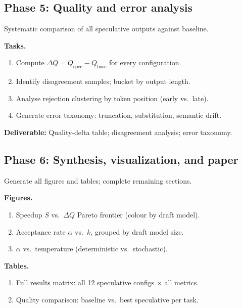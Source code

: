 \subsection{Phase 5: Quality and error analysis}

Systematic comparison of all speculative outputs against baseline.

\smallskip\noindent\textbf{Tasks.}
\begin{enumerate}\itemsep0pt
    \item Compute $\Delta Q = Q_{\text{spec}} - Q_{\text{base}}$ for every configuration.
    \item Identify disagreement samples; bucket by output length.
    \item Analyse rejection clustering by token position (early vs.\ late).
    \item Generate error taxonomy: truncation, substitution, semantic drift.
\end{enumerate}

\noindent\textbf{Deliverable:} Quality-delta table; disagreement analysis; error taxonomy.

\subsection{Phase 6: Synthesis, visualization, and paper}

Generate all figures and tables; complete remaining sections.

\smallskip\noindent\textbf{Figures.}
\begin{enumerate}\itemsep0pt
    \item Speedup $S$ vs.\ $\Delta Q$ Pareto frontier (colour by draft model).
    \item Acceptance rate $\alpha$ vs.\ $k$, grouped by draft model size.
    \item $\alpha$ vs.\ temperature (deterministic vs.\ stochastic).
\end{enumerate}

\smallskip\noindent\textbf{Tables.}
\begin{enumerate}\itemsep0pt
    \item Full results matrix: all 12 speculative configs $\times$ all metrics.
    \item Quality comparison: baseline vs.\ best speculative per task.
\end{enumerate}


